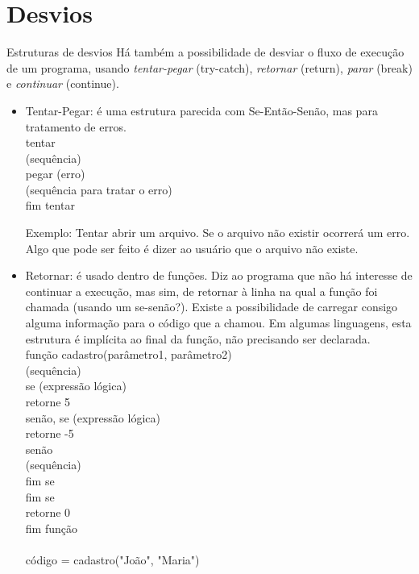\documentclass{beamer}%
\def\azul{\color{blue!90!black}}
\begin{document}
\section{Desvios}
\begin{frame}{Estruturas de desvios}
Há também a possibilidade de desviar o fluxo de execução de um
programa, usando \textit{tentar-pegar} (try-catch), \textit{retornar}
(return), \textit{parar} (break) e  \textit{continuar} (continue).

\begin{itemize}\justifying
\item Tentar-Pegar: é uma estrutura parecida com Se-Então-Senão, mas
para tratamento de erros. \\
{\azul
tentar\\
\qquad (sequência)\\
pegar (erro)\\
\qquad (sequência para tratar o erro)\\
fim tentar
}

Exemplo: Tentar abrir um arquivo. Se o arquivo não existir ocorrerá
um erro. Algo que pode ser feito é dizer ao usuário que o arquivo
não existe.
\end{itemize}

\end{frame}



\begin{frame}
 \begin{itemize}\justifying\small
\item Retornar: é usado dentro de funções. Diz ao programa que não
há interesse de continuar a execução, mas sim, de retornar à linha
na qual a função foi chamada (usando um se-senão?). Existe a
possibilidade de carregar consigo alguma informação para o código que a
chamou. Em algumas linguagens, esta estrutura é implícita ao final da
função, não precisando ser declarada.\\
{\azul
função cadastro(parâmetro1, parâmetro2)\\
\qquad (sequência)\\
\qquad se (expressão lógica)\\
\qquad\qquad retorne 5\\
\qquad senão, se (expressão lógica)\\
\qquad\qquad\qquad retorne -5\\
\qquad\qquad senão\\
\qquad\qquad\qquad (sequência)\\
\qquad\qquad fim se\\
\qquad fim se\\
\qquad retorne 0\\
fim função\\
\\
código = cadastro("João", "Maria")
}
\end{itemize}

\end{frame}
\end{document}
